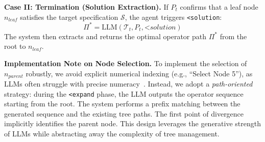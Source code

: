 \noindent\textbf{Case II: Termination (Solution Extraction).}
If $P_t$ confirms that a leaf node $n_{leaf}$ satisfies the target specification $\mathcal{S}$, the agent triggers \texttt{<solution}:
\begin{equation}
    \Pi^* = \text{LLM}(\mathcal{T}_t, P_t, \textit{<solution})
\end{equation}
The system then extracts and returns the optimal operator path $\Pi^*$ from the root to $n_{leaf}$.


\noindent\textbf{Implementation Note on Node Selection.}
To implement the selection of $n_{parent}$ robustly, we avoid explicit numerical indexing (e.g., ``Select Node 5''), as LLMs often struggle with precise numeracy~\cite{wallace2019nlp}. Instead, we adopt a \textit{path-oriented} strategy: during the \texttt{<expand} phase, the LLM outputs the operator sequence starting from the root. The system performs a prefix matching between the generated sequence and the existing tree paths. The first point of divergence implicitly identifies the parent node. This design leverages the generative strength of LLMs while abstracting away the complexity of tree management.
